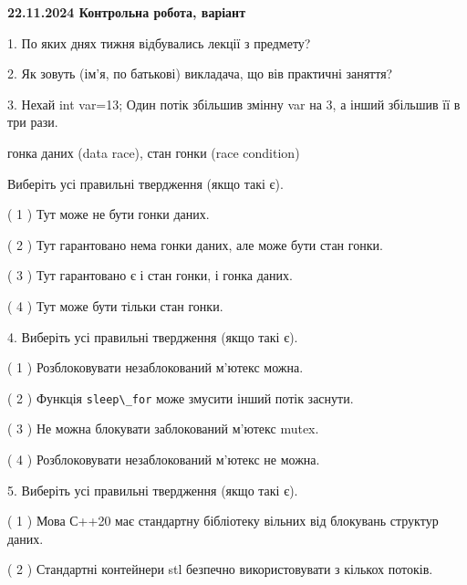 \documentclass[12pt, ukrainian]{article}
\def\code#1{\Verb!#1!}
\begin{document}
\vspace{4mm}
\newpage
\begin {large}

\textbf{22.11.2024 Контрольна робота, варіант  }\par


{
1. По яких днях тижня відбувались лекції з предмету?



\vspace{5mm}
2. Як зовуть (ім'я, по батькові) викладача, що вів практичні заняття?



\vspace{5mm}
3. Нехай int var=13; Один потік збільшив змінну var на 3, а інший збільшив її в три рази.

гонка даних (data race), стан гонки (race condition)

Виберіть усі правильні твердження (якщо такі є).\par
\vspace{2mm}
( 1 ) Тут може не бути гонки даних.%

( 2 ) Тут гарантовано нема гонки даних, але може бути стан гонки.%

( 3 ) Тут гарантовано є і стан гонки, і гонка даних.%

( 4 ) Тут може бути тільки стан гонки.%


\vspace{5mm}
4. Виберіть усі правильні твердження (якщо такі є).\par
\vspace{2mm}

( 1 ) Розблоковувати незаблокований м’ютекс можна.%

( 2 ) Функція \code{sleep\_for} може змусити інший потік заснути.%

( 3 ) Не можна блокувати заблокований м’ютекс mutex.%

( 4 ) Розблоковувати незаблокований м’ютекс не можна.%


\vspace{5mm}
5. Виберіть усі правильні твердження (якщо такі є).\par
\vspace{2mm}

( 1 ) Мова С++20 має стандартну бібліотеку вільних від блокувань структур даних.%

( 2 ) Стандартні контейнери stl безпечно використовувати з кількох потоків.%

}
\end{large}
\end{document}
